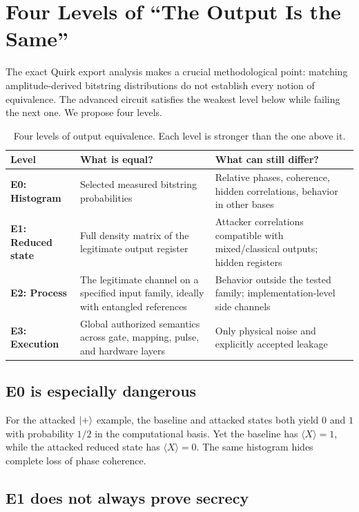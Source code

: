 \section{Four Levels of ``The Output Is the Same''}
\label{sec:equivalence-levels}

The exact Quirk export analysis makes a crucial methodological point:
matching amplitude-derived bitstring distributions do not establish every
notion of equivalence. The advanced circuit satisfies the weakest level below
while failing the next one. We propose four levels.

\begin{table}[ht]
\centering
\caption{Four levels of output equivalence. Each level is stronger than the
one above it.}
\label{tab:equivalence-levels}
\begin{tabularx}{\textwidth}{@{}>{\bfseries}p{}p{}X@{}}
\toprule
Level & What is equal? & What can still differ?\\
\midrule
E0: Histogram & Selected measured bitstring probabilities & Relative phases,
coherence, hidden correlations, behavior in other bases\\
E1: Reduced state & Full density matrix of the legitimate output register &
Attacker correlations compatible with mixed/classical outputs; hidden registers\\
E2: Process & The legitimate channel on a specified input family, ideally with
entangled references & Behavior outside the tested family; implementation-level
side channels\\
E3: Execution & Global authorized semantics across gate, mapping, pulse, and
hardware layers & Only physical noise and explicitly accepted leakage\\
\bottomrule
\end{tabularx}
\end{table}

\subsection{E0 is especially dangerous}

For the attacked $\ket{+}$ example, the baseline and attacked states both yield
$0$ and $1$ with probability $1/2$ in the computational basis. Yet the baseline
has $\langle X\rangle=1$, while the attacked reduced state has
$\langle X\rangle=0$. The same histogram hides complete loss of phase
coherence.

\subsection{E1 does not always prove secrecy}

